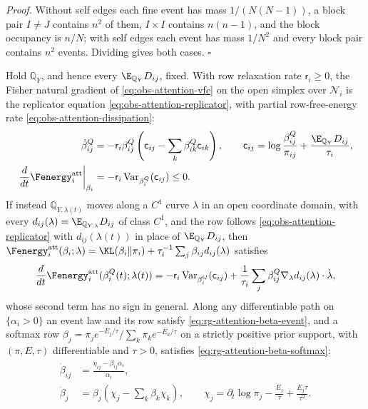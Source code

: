 \noindent\emph{Proof.}
Without self edges each fine event has mass \(1/(N(N-1))\), a block pair
\(I\ne J\) contains \(n^2\) of them, \(I\times I\) contains \(n(n-1)\), and the
block occupancy is \(n/N\); with self edges each event has mass \(1/N^2\) and
every block pair contains \(n^2\) events. Dividing gives both cases.
\(\square\)

Hold \(\mathbb Q_Y\), and hence every \(\E_{\mathbb Q_Y}D_{ij}\), fixed. With
row relaxation rate \(\mathsf r_i\geq0\), the Fisher natural gradient of
\eqref{eq:obs-attention-vfe} on the open simplex over \(\mathcal N_i\) is the
replicator equation \eqref{eq:obs-attention-replicator}, with partial
row-free-energy rate \eqref{eq:obs-attention-dissipation}:
\begin{align}
\dot\beta^Q_{ij}
&=-\mathsf r_i\beta^Q_{ij}
\left(\mathsf c_{ij}-\sum_k\beta^Q_{ik}\mathsf c_{ik}\right),
\qquad
\mathsf c_{ij}=\log\frac{\beta^Q_{ij}}{\pi_{ij}}
+\frac{\E_{\mathbb Q_Y}D_{ij}}{\tau_i},
\label{eq:obs-attention-replicator}\\
\left.\frac{d}{dt}\Fenergy_i^{\rm att}\right|_{\beta_i}
&=-\mathsf r_i\operatorname{Var}_{\beta^Q_i}(\mathsf c_{ij})\leq0.
\label{eq:obs-attention-dissipation}
\end{align}
If instead \(\mathbb Q_{Y,\lambda(t)}\) moves along a \(C^1\) curve \(\lambda\) in
an open coordinate domain, with every
\(d_{ij}(\lambda)=\E_{\mathbb Q_{Y,\lambda}}D_{ij}\) of class \(C^1\), and the
row follows \eqref{eq:obs-attention-replicator} with \(d_{ij}(\lambda(t))\) in
place of \(\E_{\mathbb Q_Y}D_{ij}\), then
\(\Fenergy_i^{\rm att}(\beta_i;\lambda)
=\KL(\beta_i\Vert\pi_i)+\tau_i^{-1}\sum_j\beta_{ij}d_{ij}(\lambda)\) satisfies
\begin{equation}
\frac{d}{dt}\Fenergy_i^{\rm att}(\beta_i^Q(t);\lambda(t))
=-\mathsf r_i\operatorname{Var}_{\beta^Q_i}(\mathsf c_{ij})
+\frac1{\tau_i}\sum_j\beta^Q_{ij}\nabla_\lambda d_{ij}(\lambda)\cdot\dot\lambda,
\label{eq:obs-attention-joint-rate}
\end{equation}
whose second term has no sign in general. Along any differentiable path on
\(\{\alpha_i>0\}\) an event law and its row satisfy
\eqref{eq:rg-attention-beta-event}, and a softmax row
\(\beta_j=\pi_je^{-E_j/\tau}/\sum_k\pi_ke^{-E_k/\tau}\) on a strictly positive
prior support, with \((\pi,E,\tau)\) differentiable and \(\tau>0\), satisfies
\eqref{eq:rg-attention-beta-softmax}:
\begin{align}
\dot\beta_{ij}
&=\frac{\dot\eta_{ij}-\beta_{ij}\dot\alpha_i}{\alpha_i},
\label{eq:rg-attention-beta-event}\\
\dot\beta_j&=\beta_j\left(\chi_j-\sum_k\beta_k\chi_k\right),
\qquad
\chi_j=\partial_t\log\pi_j-\frac{\dot E_j}{\tau}
+\frac{E_j\dot\tau}{\tau^2}.
\label{eq:rg-attention-beta-softmax}
\end{align}

